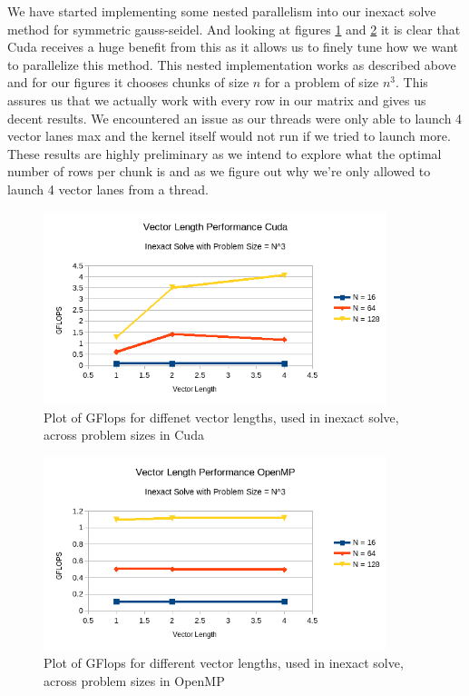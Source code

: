 \documentclass{ccr15}
\begin{document}
We have started implementing some nested parallelism into our inexact solve method for symmetric gauss-seidel.
And looking at figures \ref{vlength_cuda} and \ref{vlength_openmp} it is clear that Cuda receives a huge benefit
from this as it allows us to finely tune how we want to parallelize this method. This nested implementation works as described
above and for our figures it chooses chunks of size $n$ for a problem of size $n^3$. This assures us that we 
actually work with every row in our matrix and gives us decent results. We encountered an issue as our threads
were only able to launch 4 vector lanes max and the kernel itself would not run if we tried to launch more. These results
are highly preliminary as we intend to explore what the optimal number of rows per chunk is and as we figure out
why we're only allowed to launch 4 vector lanes from a thread.

\begin{figure}[H]
	\centering
	\includegraphics[width=10cm]{plots/ZAB-VectorLengthCuda.png}
	\caption{Plot of GFlops for diffenet vector lengths, used in inexact solve, across problem sizes in Cuda}
	\label{vlength_cuda}
\end{figure}

\begin{figure}[H]
	\centering
	\includegraphics[width=10cm]{plots/ZAB-VectorLengthOpenMP.png}
	\caption{Plot of GFlops for different vector lengths, used in inexact solve, across problem sizes in OpenMP}
	\label{vlength_openmp}
\end{figure}
\end{document}
